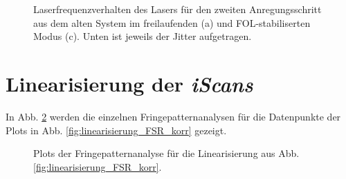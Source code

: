 \begin{figure}[hp]
 	\centering
 	\footnotesize
 	\fbox{\parbox{\dimexpr \linewidth - 2\fboxrule - 2\fboxsep}{
 	\subfloat[]{
		\label{subfig:laserstabilitaet_alt_freilaufend}
		
		}\\
	 \subfloat[]{
		\label{subfig:laserstabilitaet_alt_FOL}
		
		}
	}}
	\caption[Laserfrequenzverhalten \textit{TA-Pro}]{Laserfrequenzverhalten des
	Lasers für den zweiten Anregungsschritt aus dem alten System im freilaufenden
	(a) und FOL-stabiliserten Modus (c). Unten ist jeweils der Jitter aufgetragen.}
	\label{fig:laserstabilitaet_c}
\end{figure}

\newpage
\section{Linearisierung der
\textit{iScans}}\label{anh:sec:linearisierung}
In Abb. \ref{fig:linearisierung_FSR_korr_anh} werden die einzelnen
Fringepatternanalysen für die Datenpunkte der Plots in Abb.
\ref{fig:linearisierung_FSR_korr} gezeigt.
\begin{figure}[hb]
 	\centering
 	\footnotesize
	\caption[Linearitaet \textit{iScan}, Fringepatternanlyse]{Plots der
	Fringepatternanalyse für die Linearisierung aus Abb. \ref{fig:linearisierung_FSR_korr}.}
	\label{fig:linearisierung_FSR_korr_anh}
\end{figure}
